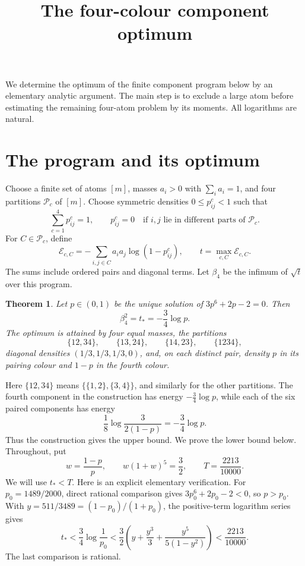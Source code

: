 \documentclass[11pt]{article}
\title{The four-colour component optimum}
\author{}
\date{}
\newtheorem{theorem}{Theorem}
\newcommand{\E}{\mathcal E}
\newcommand{\PP}{\mathcal P}
\begin{document}
\maketitle

We determine the optimum of the finite component program below by an
elementary analytic argument. The main step is to exclude a large atom before
estimating the remaining four-atom problem by its moments.
All logarithms are natural.

\section{The program and its optimum}

Choose a finite set of atoms $[m]$, masses $a_i>0$ with $\sum_i a_i=1$,
and four partitions $\PP_c$ of $[m]$. Choose symmetric densities
$0\le p^c_{ij}<1$ such that
\[
 \sum_{c=1}^4p^c_{ij}=1,
 \qquad p^c_{ij}=0\quad\text{if $i,j$ lie in different parts of $\PP_c$}.
\]
For $C\in\PP_c$, define
\[
 \E_{c,C}=-\sum_{i,j\in C}a_i a_j\log(1-p^c_{ij}),
 \qquad t=\max_{c,C}\E_{c,C}.
\]
The sums include ordered pairs and diagonal terms. Let $\beta_4$ be the
infimum of $\sqrt t$ over this program.

\begin{theorem}\label{thm:main}
Let $p\in(0,1)$ be the unique solution of $3p^6+2p-2=0$. Then
\[
 \beta_4^2=t_*=-\frac34\log p.
\]
The optimum is attained by four equal masses, the partitions
\[
 \{12,34\},\qquad\{13,24\},\qquad\{14,23\},\qquad\{1234\},
\]
diagonal densities $(1/3,1/3,1/3,0)$, and, on each distinct pair,
density $p$ in its pairing colour and $1-p$ in the fourth colour.
\end{theorem}

Here $\{12,34\}$ means $\{\{1,2\},\{3,4\}\}$, and similarly for the
other partitions. The fourth component in the construction has energy
$-\frac34\log p$, while each of the six paired components has energy
\[
 \frac18\log\frac{3}{2(1-p)}=-\frac34\log p.
\]
Thus the construction gives the upper bound. We prove the lower bound below.
Throughout, put
\begin{equation}\label{eq:parameters}
 w=\frac{1-p}{p},\qquad
 w(1+w)^5=\frac32,\qquad
 T=\frac{2213}{10000}.
\end{equation}
We will use $t_*<T$. Here is an explicit elementary verification. For
$p_0=1489/2000$, direct rational comparison gives
$3p_0^6+2p_0-2<0$, so $p>p_0$. With $y=511/3489=(1-p_0)/(1+p_0)$,
the positive-term logarithm series gives
\begin{equation}\label{eq:threshold}
 t_*<\frac34\log\frac1{p_0}
 <\frac32\left(y+\frac{y^3}{3}+\frac{y^5}{5(1-y^2)}\right)
 <\frac{2213}{10000}.
\end{equation}
The last comparison is rational.
\end{document}
